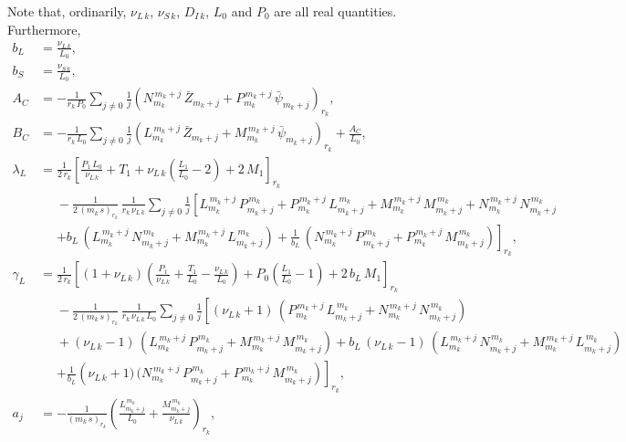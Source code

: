 \documentclass[12pt,prb,aps]{revtex4-1}
\begin{document}
Note that, ordinarily, $\nu_{L\,k}$, $\nu_{S\,k}$, $D_{I\,k}$, $L_0$ and $P_0$ are all real quantities. 
Furthermore, 
\begin{align}
b_{L} &= \frac{\nu_{L\,k}}{L_0},\label{ebl}\\[0.5ex]
b_{S} &= \frac{\nu_{S\,k}}{L_0},\label{ebs}\\[0.5ex]
A_{C} &= - \frac{1}{r_k\,P_0}\sum_{j\neq 0}\frac{1}{j}\left(N_{m_k}^{\,m_k+j}\,\bar{Z}_{m_k+j}+ P_{m_k}^{\,m_k+j}\,\bar{\psi}_{m_k+j}\right)_{r_k},\\[0.5ex]
B_{C} &= - \frac{1}{r_k\,L_0}\sum_{j\neq 0}\frac{1}{j}\left(L_{m_k}^{\,m_k+j}\,\bar{Z}_{m_k+j}+ M_{m_k}^{\,m_k+j}\,\bar{\psi}_{m_k+j}\right)_{r_k}+\frac{A_{C}}{L_0},\\[0.5ex]
\lambda_{L} &= \frac{1}{2\,r_k}\left[\frac{P_1\,L_0}{\nu_{L\,k}} + T_1 + \nu_{L\,k}\left(\frac{L_1}{L_0}-2\right)+2\,M_1\right]_{r_k}\\[0.5ex]&
\phantom{=}-\frac{1}{2\,(m_k\,s)_{r_k}}\,\frac{1}{r_k\,\nu_{L\,k}}\sum_{j\neq0}\frac{1}{j}\left[L_{m_k}^{\,m_k+j}\,P_{m_k+j}^{\,m_k}+P_{m_k}^{\,m_k+j}\,L_{m_k+j}^{\,m_k} +
M_{m_k}^{\,m_k+j}\,M_{m_k+j}^{\,m_k}+N_{m_k}^{\,m_k+j}\,N_{m_k+j}^{\,m_k}\phantom{\frac{a}{b_L}}\right.\nonumber\\[0.5ex]&
\phantom{=}\left. + b_{L}\,(L_{m_k}^{\,{m_k}+j}\,N_{m_k+j}^{\,m_k}+M_{m_k}^{\,m_k+j}\,L_{m_k+j}^{\,m_k})+\frac{1}{b_{L}}\,(N_{m_k}^{\,m_k+j}\,P_{m_k+j}^{\,m_k}+ P_{m_k}^{\,m_k+j}\,M_{m_k+j}^{\,m_k})\right]_{r_k},\nonumber\\[0.5ex]
\gamma_{L} &=\frac{1}{2\,r_k}\left[(1+\nu_{L\,k})\left(\frac{P_1}{\nu_{L\,k}}+\frac{T_1}{L_0}-\frac{\nu_{L\,k}}{L_0}\right)+
P_0\left(\frac{L_1}{L_0}-1\right)+2\,b_{L}\,M_1\right]_{r_k}\nonumber\\[0.5ex]
&\phantom{=}-\frac{1}{2\,(m_k\,s)_{r_k}}\,\frac{1}{r_k\,\nu_{L\,k}\,L_0}\sum_{j\neq 0}\frac{1}{j}\left[(\nu_{L\,k}+1)\,(P_{m_k}^{\,m_k+j}\,L_{m_k+j}^{\,m_k}+N_{m_k}^{\,m_k+j}\,N_{m_k+j}^{\,m_k})\phantom{\frac{a}{b_L}}\right.\nonumber\\[0.5ex]
&\phantom{=} +(\nu_{L\,k}-1)\,(L_{m_k}^{\,m_k+j}\,P_{m_k+j}^{\,m_k}+M_{m_k}^{\,m_k+j}\,M_{m_k+j}^{\,m_k})+b_{L}\,(\nu_{L\,k}-1)\,(L_{m_k}^{\,m_k+j}\,N_{m_k+j}^{\,m_k}+M_{m_k}^{\,m_k+j}\,L_{m_k+j}^{\,m_k}) \nonumber\\[0.5ex]
&\phantom{=} \left. + \frac{1}{b_{L}}\left(\nu_{L\,k}+1)\,(N_{m_k}^{\,m_k+j}\,P_{m_k+j}^{\,m_k}+P_{m_k}^{\,m_k+j}\,M_{m_k+j}^{\,m_k}\right)\right]_{r_k},\\[0.5ex]
a_j&=-\frac{1}{(m_k\,s)_{r_k}}\left(\frac{L^{\,m_k}_{m_k+j}}{L_0}+\frac{M^{\,m_k}_{m_k+j}}{\nu_{L\,k}}\right)_{r_k},\label{e135}\\[0.5ex]

\end{align}
\end{document}
